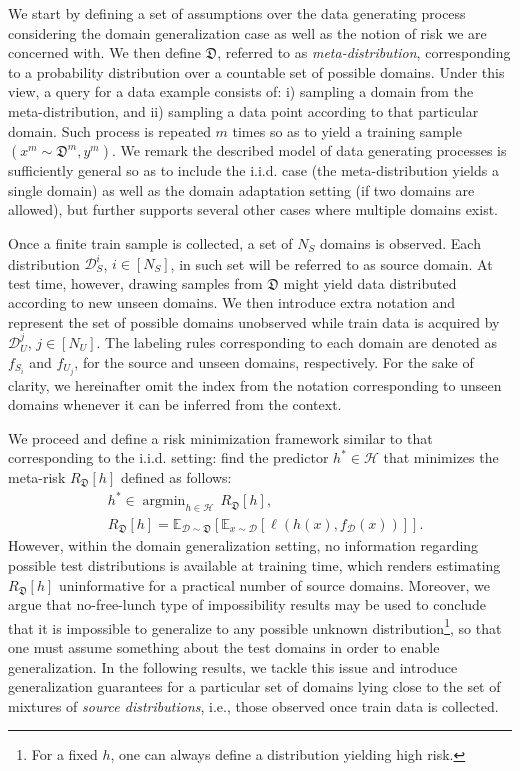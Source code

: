 \documentclass{article}
\DeclareMathOperator*{\argmin}{argmin}
\begin{document}
We start by defining a set of assumptions over the data generating process considering the domain generalization case as well as the notion of risk we are concerned with. We then define $\mathfrak{D}$, referred to as \emph{meta-distribution}, corresponding to a probability distribution over a countable set of possible domains. Under this view, a query for a data example consists of: i) sampling a domain from the meta-distribution, and ii) sampling a data point according to that particular domain. Such process is repeated $m$ times so as to yield a training sample $(x^m\sim \mathfrak{D}^m, y^m)$. We remark the described model of data generating processes is sufficiently general so as to include the i.i.d. case (the meta-distribution yields a single domain) as well as the domain adaptation setting (if two domains are allowed), but further supports several other cases where multiple domains exist.

Once a finite train sample is collected, a set of $N_S$ domains is observed. Each distribution $\mathcal{D}^i_S$, $i \in [N_S]$, in such set will be referred to as source domain. At test time, however, drawing samples from $\mathfrak{D}$ might yield data distributed according to new unseen domains. We then introduce extra notation and represent the set of possible domains unobserved while train data is acquired by $\mathcal{D}^j_U$, $j \in [N_U]$. The labeling rules corresponding to each domain are denoted as $f_{S_i}$ and $f_{U_j}$, for the source and unseen domains, respectively. For the sake of clarity, we hereinafter omit the index from the notation corresponding to unseen domains whenever it can be inferred from the context.


We proceed and define a risk minimization framework similar to that corresponding to the i.i.d. setting: find the predictor $h^* \in \mathcal{H}$ that minimizes the meta-risk $R_{\mathfrak{D}}[h]$ defined as follows: 
\begin{equation}\label{eq:risk_DG}
\begin{split}
& h^* \in \argmin_{h\in \mathcal{H}} \, R_{\mathfrak{D}}[h], \\  
& R_{\mathfrak{D}}[h]=\mathbb{E}_{\mathcal{D}\sim \mathfrak{D}}[\mathbb{E}_{x\sim\mathcal{D}}[\ell(h(x), f_{\mathcal{D}}(x))]].    
\end{split}
\end{equation}
However, within the domain generalization setting, no information regarding possible test distributions is available at training time, which renders estimating $R_{\mathfrak{D}}[h]$ uninformative for a practical number of source domains. Moreover, we argue that no-free-lunch type of impossibility results may be used to conclude that it is impossible to generalize to any possible unknown distribution\footnote{For a fixed $h$, one can always define a distribution yielding high risk.}, so that one must assume something about the test domains in order to enable generalization. In the following results, we tackle this issue and introduce generalization guarantees for a particular set of domains lying close to the set of mixtures of \emph{source distributions}, i.e., those observed once train data is collected.
\end{document}
